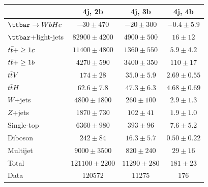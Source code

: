 \begin{table}[htbp]
\small
\begin{center}
\begin{tabular}{l*{3}{c}}
\hline\hline
 & 4j, 2b & 4j, 3b & 4j, 4b \\
\hline
$\Hc$  &   $ -30 \pm 470 $ &   $ -20 \pm 300 $ &   $ -0.4 \pm 5.9 $ \\ 
\hline
$\ttbar$+light-jets  &    $ 82900 \pm 4200 $ &   $ 4900 \pm 500 $ &   $ 16 \pm 12 $ \\ 
$t\bar{t}+\geq1c$  &   $ 11400 \pm 4800 $ &   $ 1360 \pm 550 $ &   $ 5.9 \pm 4.2 $ \\ 
$t\bar{t}+\geq1b$  &   $ 4270 \pm 590 $ &   $ 3400 \pm 350 $ &   $ 110 \pm 17 $ \\ 
$t\bar{t}V$  &    $ 174 \pm 28 $ &   $ 35.0 \pm 5.9 $ &   $ 2.69 \pm 0.55 $ \\ 
$t\bar{t}H$  &   $ 62.6 \pm 7.8 $ &   $ 47.3 \pm 6.3 $ &   $ 4.68 \pm 0.69 $ \\ 
$W$+jets  &   $ 4800 \pm 1800 $ &   $ 260 \pm 100 $ &   $ 2.9 \pm 1.3 $ \\ 
$Z$+jets  &    $ 1870 \pm 730 $ &   $ 102 \pm 41 $ &   $ 1.9 \pm 1.0 $ \\ 
Single-top  &  $ 6360 \pm 980 $ &   $ 393 \pm 96 $ &   $ 7.6 \pm 5.2 $ \\ 
Diboson  &   $ 242 \pm 84 $ &   $ 16.3 \pm 5.7 $ &   $ 0.50 \pm 0.22 $ \\ 
Multijet  &   $ 9000 \pm 3500 $ &   $ 820 \pm 240 $ &   $ 29 \pm 16 $ \\ 
\hline
Total & $ 121100 \pm 2200 $ &   $ 11290 \pm 280 $ &   $ 181 \pm 23 $ \\ 
\hline
Data & 120572  & 11275  & 176  \\ 
\hline\hline      
\end{tabular}
\vspace{0.2cm}


\end{center}
\end{table}
